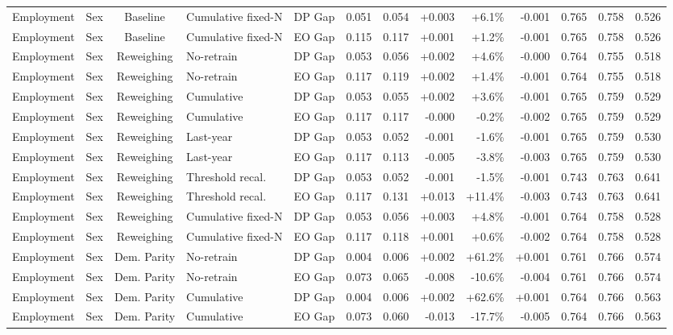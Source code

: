 \begin{longtable}{llcllrrrrrrrr}
Employment & Sex & Baseline & Cumulative fixed-N & DP Gap & 0.051 & 0.054 & +0.003 & +6.1\% & -0.001 & 0.765 & 0.758 & 0.526 \\
Employment & Sex & Baseline & Cumulative fixed-N & EO Gap & 0.115 & 0.117 & +0.001 & +1.2\% & -0.001 & 0.765 & 0.758 & 0.526 \\
Employment & Sex & Reweighing & No-retrain & DP Gap & 0.053 & 0.056 & +0.002 & +4.6\% & -0.000 & 0.764 & 0.755 & 0.518 \\
Employment & Sex & Reweighing & No-retrain & EO Gap & 0.117 & 0.119 & +0.002 & +1.4\% & -0.001 & 0.764 & 0.755 & 0.518 \\
Employment & Sex & Reweighing & Cumulative & DP Gap & 0.053 & 0.055 & +0.002 & +3.6\% & -0.001 & 0.765 & 0.759 & 0.529 \\
Employment & Sex & Reweighing & Cumulative & EO Gap & 0.117 & 0.117 & -0.000 & -0.2\% & -0.002 & 0.765 & 0.759 & 0.529 \\
Employment & Sex & Reweighing & Last-year & DP Gap & 0.053 & 0.052 & -0.001 & -1.6\% & -0.001 & 0.765 & 0.759 & 0.530 \\
Employment & Sex & Reweighing & Last-year & EO Gap & 0.117 & 0.113 & -0.005 & -3.8\% & -0.003 & 0.765 & 0.759 & 0.530 \\
Employment & Sex & Reweighing & Threshold recal. & DP Gap & 0.053 & 0.052 & -0.001 & -1.5\% & -0.001 & 0.743 & 0.763 & 0.641 \\
Employment & Sex & Reweighing & Threshold recal. & EO Gap & 0.117 & 0.131 & +0.013 & +11.4\% & -0.003 & 0.743 & 0.763 & 0.641 \\
Employment & Sex & Reweighing & Cumulative fixed-N & DP Gap & 0.053 & 0.056 & +0.003 & +4.8\% & -0.001 & 0.764 & 0.758 & 0.528 \\
Employment & Sex & Reweighing & Cumulative fixed-N & EO Gap & 0.117 & 0.118 & +0.001 & +0.6\% & -0.002 & 0.764 & 0.758 & 0.528 \\
Employment & Sex & Dem. Parity & No-retrain & DP Gap & 0.004 & 0.006 & +0.002 & +61.2\% & +0.001 & 0.761 & 0.766 & 0.574 \\
Employment & Sex & Dem. Parity & No-retrain & EO Gap & 0.073 & 0.065 & -0.008 & -10.6\% & -0.004 & 0.761 & 0.766 & 0.574 \\
Employment & Sex & Dem. Parity & Cumulative & DP Gap & 0.004 & 0.006 & +0.002 & +62.6\% & +0.001 & 0.764 & 0.766 & 0.563 \\
Employment & Sex & Dem. Parity & Cumulative & EO Gap & 0.073 & 0.060 & -0.013 & -17.7\% & -0.005 & 0.764 & 0.766 & 0.563 \\

\end{longtable}

